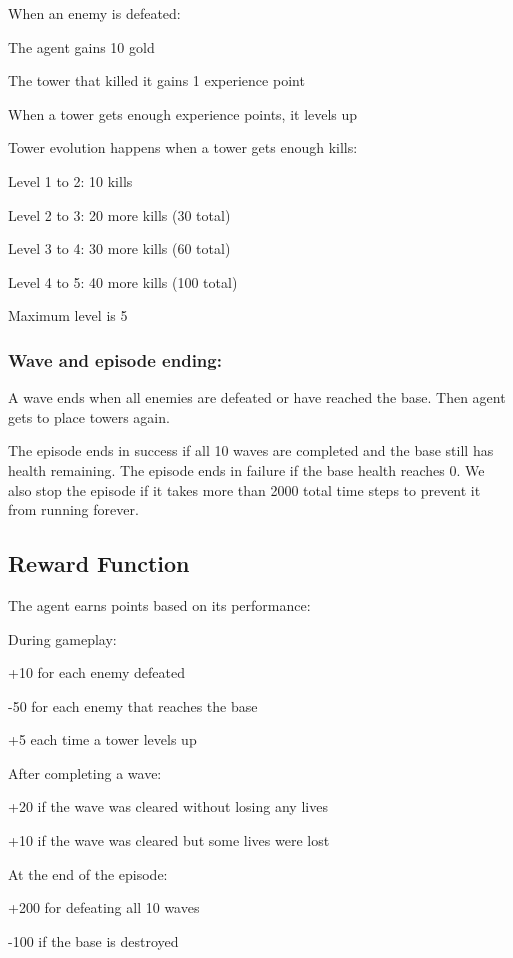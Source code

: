 \documentclass[12pt]{article}
\begin{document}
When an enemy is defeated:
\begin{compactitem}
\item The agent gains 10 gold
\item The tower that killed it gains 1 experience point
\item When a tower gets enough experience points, it levels up
\end{compactitem}

Tower evolution happens when a tower gets enough kills:
\begin{compactitem}
\item Level 1 to 2: 10 kills
\item Level 2 to 3: 20 more kills (30 total)
\item Level 3 to 4: 30 more kills (60 total)
\item Level 4 to 5: 40 more kills (100 total)
\item Maximum level is 5
\end{compactitem}

\subsubsection*{Wave and episode ending:}

A wave ends when all enemies are defeated or have reached the base. Then agent gets to place towers again. 

The episode ends in success if all 10 waves are completed and the base still has health remaining. The episode ends in failure if the base health reaches 0. We also stop the episode if it takes more than 2000 total time steps to prevent it from running forever.

\subsection*{Reward Function}

The agent earns points based on its performance:

During gameplay:
\begin{compactitem}
\item +10 for each enemy defeated
\item -50 for each enemy that reaches the base
\item +5 each time a tower levels up
\end{compactitem}
After completing a wave:
\begin{compactitem}
\item +20 if the wave was cleared without losing any lives
\item +10 if the wave was cleared but some lives were lost
\end{compactitem}
At the end of the episode:
\begin{compactitem}
\item +200 for defeating all 10 waves
\item -100 if the base is destroyed
\end{compactitem}
\end{document}
